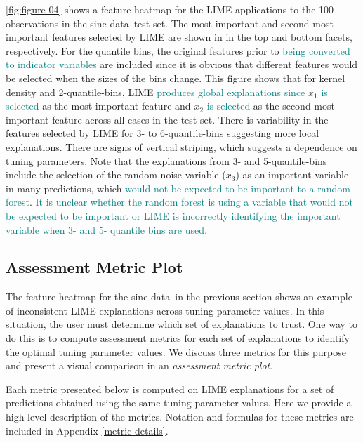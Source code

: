 \documentclass[AMS,STIX2COL]{WileyNJD-v2}\usepackage[]{graphicx}\usepackage[]{color}
\newcommand{\kge}[1]{\textcolor{teal}{#1}}
\newcommand{\data}{sine data}
\renewcommand{\sout}[1]{\unskip}
\begin{document}
\autoref{fig:figure-04} shows a feature heatmap for the LIME applications to the 100 observations in the \data \ test set. The most important and second most important features selected by LIME are shown in in the top and bottom facets, respectively. For the quantile bins, the original features prior to \kge{being converted to indicator variables} \sout{the indicator variable transformation} are included since it is obvious that different features would be selected when the sizes of the bins change. This figure shows that for kernel density and 2-quantile-bins, LIME \kge{produces global explanations since} \sout{selects} $x_1$ \kge{is selected} as the most important feature and $x_2$ \kge{is selected} as the second most important feature across all cases in the test set. \sout{These explanations are not local.} There is variability in the features selected by LIME for 3- to 6-quantile-bins suggesting more local explanations. There are signs of vertical striping, which suggests a dependence on tuning parameters. Note that the explanations from 3- and 5-quantile-bins include the selection of the random noise variable ($x_3$) as an important variable in many predictions, which \kge{would not be expected to be important to a random forest}\sout{should not be the case}. \kge{It is unclear whether the random forest is using a variable that would not be expected to be important or LIME is incorrectly identifying the important variable when 3- and 5- quantile bins are used.} \sout{The pattern seen in the explanations for 3- to 6-quantile-bins may suggest local explanations, but the dependence on tuning parameters makes it unclear which set of explanations to use.}

\subsection{Assessment Metric Plot} \label{assess-metric}

The feature heatmap for the \data \ in the previous section shows an example of inconsistent LIME explanations across tuning parameter values. In this situation, the user must determine which set of explanations to trust. One way to do this is to compute assessment metrics for each set of explanations to identify the optimal tuning parameter values. We discuss three metrics for this purpose and present a visual comparison in an \emph{assessment metric plot}.

Each metric presented below is computed on LIME explanations for a set of predictions obtained using the same tuning parameter values. Here we provide a high level description of the metrics. Notation and formulas for these metrics are included in Appendix \ref{metric-details}.
\end{document}
